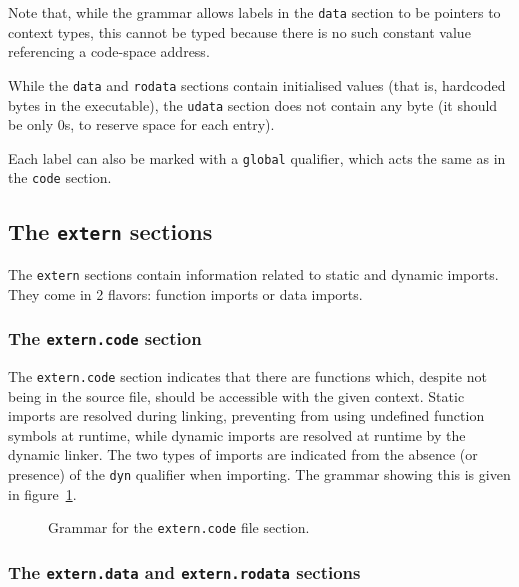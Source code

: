 \noindent Note that, while the grammar allows labels in the \texttt{data} section to be pointers to context types, this cannot be typed because there is no such constant value referencing a code-space address.

While the \texttt{data} and \texttt{rodata} sections contain initialised values (that is, hardcoded bytes in the executable), the \texttt{udata} section does not contain any byte (it should be only $0$s, to reserve space for each entry).

Each label can also be marked with a \texttt{global} qualifier, which acts the same as in the \texttt{code} section.

\subsection{The \texttt{extern} sections}\label{subsec:nstar-common-sections-extern}

The \texttt{extern} sections contain information related to static and dynamic imports.
They come in 2 flavors: function imports or data imports.

\subsubsection{The \texttt{extern.code} section}\label{subsubsec:nstar-common-sections-extern-code}

The \texttt{extern.code} section indicates that there are functions which, despite not being in the source file, should be accessible with the given context.
Static imports are resolved during linking, preventing from using undefined function symbols at runtime, while dynamic imports are resolved at runtime by the dynamic linker.
The two types of imports are indicated from the absence (or presence) of the \texttt{dyn} qualifier when importing.
The grammar showing this is given in figure~\ref{fig:nstar-common-sections-extern-code-grammar}.

\begin{figure}[htb]
  \centering


  \caption{Grammar for the \texttt{extern.code} file section.}
  \label{fig:nstar-common-sections-extern-code-grammar}
\end{figure}

\subsubsection{The \texttt{extern.data} and \texttt{extern.rodata} sections}\label{subsubsec:nstar-common-sections-extern-data}

